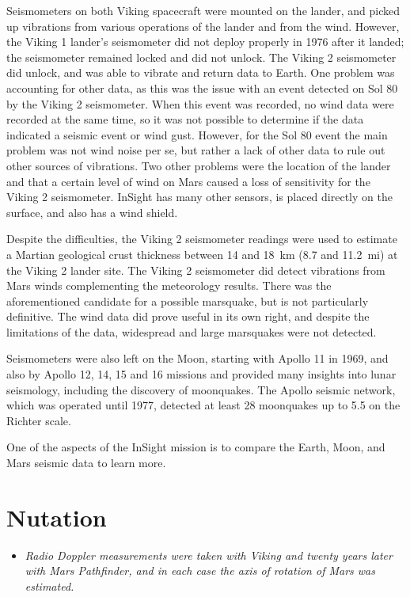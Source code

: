 Seismometers on both Viking spacecraft were mounted on the lander, and
picked up vibrations from various operations of the lander and from the
wind. However, the Viking 1 lander's seismometer did not deploy properly
in 1976 after it landed; the seismometer remained locked and did not
unlock. The Viking 2 seismometer did unlock, and was able to vibrate and
return data to Earth. One problem was accounting for other data, as this
was the issue with an event detected on Sol 80 by the Viking 2
seismometer. When this event was recorded, no wind data were recorded at
the same time, so it was not possible to determine if the data indicated
a seismic event or wind gust. However, for the Sol 80 event the main
problem was not wind noise per se, but rather a lack of other data to
rule out other sources of vibrations. Two other problems were the
location of the lander and that a certain level of wind on Mars caused a
loss of sensitivity for the Viking 2 seismometer. InSight has many other
sensors, is placed directly on the surface, and also has a wind shield.

Despite the difficulties, the Viking 2 seismometer readings were used to
estimate a Martian geological crust thickness between 14 and 18~km (8.7
and 11.2~mi) at the Viking 2 lander site. The Viking 2 seismometer did
detect vibrations from Mars winds complementing the meteorology results.
There was the aforementioned candidate for a possible marsquake, but is
not particularly definitive. The wind data did prove useful in its own
right, and despite the limitations of the data, widespread and large
marsquakes were not detected.

Seismometers were also left on the Moon, starting with Apollo 11 in
1969, and also by Apollo 12, 14, 15 and 16 missions and provided many
insights into lunar seismology, including the discovery of moonquakes.
The Apollo seismic network, which was operated until 1977, detected at
least 28 moonquakes up to 5.5 on the Richter scale.

One of the aspects of the InSight mission is to compare the Earth, Moon,
and Mars seismic data to learn more.

\section{Nutation}\label{nutation}

\begin{itemize}
\item
  \emph{Radio Doppler measurements were taken with Viking and twenty
  years later with Mars Pathfinder, and in each case the axis of
  rotation of Mars was estimated.}
\end{itemize}


